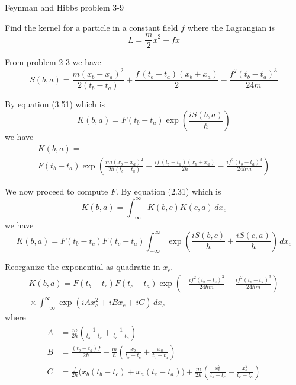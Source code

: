 \documentclass[12pt]{article}
\begin{document}
Feynman and Hibbs problem 3-9

\bigskip
Find the kernel for a particle in a constant field $f$
where the Lagrangian is
\begin{equation*}
L=\frac{m}{2}\dot x^2+fx
\end{equation*}

From problem 2-3 we have
\begin{equation*}
S(b,a)=\frac{m(x_b-x_a)^2}{2(t_b-t_a)}+\frac{f\,(t_b-t_a)(x_b+x_a)}{2}-\frac{f^2(t_b-t_a)^3}{24m}
\end{equation*}

By equation (3.51) which is
\begin{equation*}
K(b,a)=F(t_b-t_a)\exp\left(\frac{iS(b,a)}{\hbar}\right)
\end{equation*}
we have
\begin{multline*}
K(b,a)=
\\
F(t_b-t_a)\exp\left(
\frac{im(x_b-x_a)^2}{2\hbar(t_b-t_a)}
+\frac{if\,(t_b-t_a)(x_b+x_a)}{2\hbar}
-\frac{if^2(t_b-t_a)^3}{24\hbar m}
\right)
\tag{1}
\end{multline*}

We now proceed to compute $F$. By equation (2.31) which is
\begin{equation*}
K(b,a)=\int_{-\infty}^\infty K(b,c)K(c,a)\,dx_c
\end{equation*}
we have
\begin{equation*}
K(b,a)=F(t_b-t_c)F(t_c-t_a)\int_{-\infty}^\infty
\exp\left(\frac{iS(b,c)}{\hbar}+\frac{iS(c,a)}{\hbar}\right)
\,dx_c
\end{equation*}

Reorganize the exponential as quadratic in $x_c$.
\begin{multline*}
K(b,a)=F(t_b-t_c)F(t_c-t_a)
\exp\left(-\frac{if^2(t_b-t_c)^3}{24\hbar m}-\frac{if^2(t_c-t_a)^3}{24\hbar m}\right)
\\[1ex]
{}\times
\int_{-\infty}^\infty
\exp\left(iAx_c^2+iBx_c+iC\right)
\,dx_c
\tag{2}
\end{multline*}
where
\begin{align*}
A&=\frac{m}{2\hbar}\left(\frac{1}{t_b-t_c}+\frac{1}{t_c-t_a}\right)
\tag{3}
\\
B&=\frac{(t_b-t_a)f}{2\hbar}-\frac{m}{\hbar}\left(\frac{x_b}{t_b-t_c}+\frac{x_a}{t_c-t_a}\right)
\tag{4}
\\
C&=\frac{f}{2\hbar}\big(x_b(t_b-t_c)+x_a(t_c-t_a)\big)+\frac{m}{2\hbar}
\left(\frac{x_b^2}{t_b-t_c}+\frac{x_a^2}{t_c-t_a}\right)
\tag{5}
\end{align*}
\end{document}
